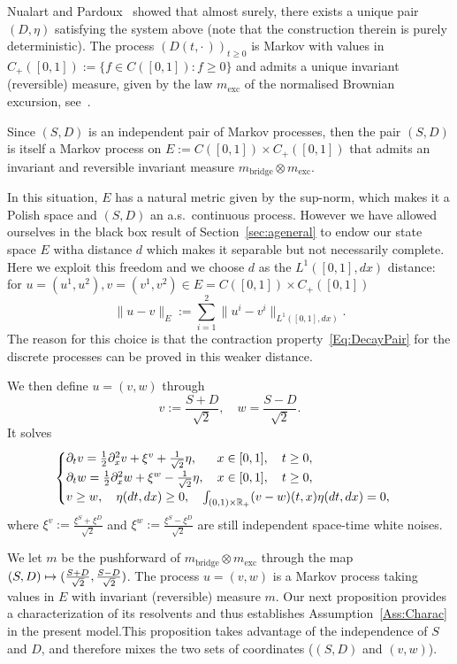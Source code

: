 \documentclass[10pt]{amsart}
\theoremstyle{definition}\newtheorem{defi}[theo]{Definition}\newtheorem{rema}[theo]{Remark}\newtheorem{exam}[theo]{Example}\newtheorem{exem}[theo]{Example}\newtheorem{nota}[theo]{Notation}
\theoremstyle{plain}
\newcommand{\R}{\mathbb{R}}
\newcommand{\mBB}{m_{\mathrm{bridge}}}
\newcommand{\mBE}{m_{\mathrm{exc}}}
\let\oldmapsto\mapsto
\renewcommand*{\mapsto}{\mathchoice{\longmapsto}{\oldmapsto}{\oldmapsto}{\oldmapsto}}
\begin{document}
Nualart and Pardoux~\cite{NualartPardoux92} showed that almost surely, there exists a unique pair $(D,\eta)$ satisfying the system above (note that the construction therein is purely deterministic). The process $(D(t,\cdot\,))_{t\geq 0}$ is Markov with values in $C_+([0,1]):=\{f\in C([0,1]): f\geq 0\}$ and admits a unique invariant (reversible) measure, given by the law $\mBE$ of the normalised Brownian excursion, see~\cite{MR3616274,Zambotti2001}.

Since $(S,D)$ is an independent pair of Markov processes, then the pair $(S,D)$ is itself a Markov process on $E:=C([0,1])\times C_+([0,1])$ that admits an invariant and reversible invariant measure $\mBB \otimes \mBE$.

In this situation, $E$ has a natural metric given by the sup-norm, which makes it a Polish space and $(S,D)$ an a.s.~continuous process. However we have allowed ourselves in the black box result of Section~\ref{sec:ageneral} to endow our state space $E$ with\linebreak a distance $d$ which makes it separable but not necessarily complete. Here we exploit this freedom and we choose $d$ as the $L^1([0,1],dx)$ distance: for $u=(u^1,u^2), v=(v^1,v^2)\in E=C([0,1])\times C_+([0,1])$
\[
\|u-v\|_E:=\sum_{i=1}^2\|u^i-v^i\|_{L^1([0,1],dx)}.
\]
The reason for this choice is that the contraction property~\eqref{Eq:DecayPair} for the discrete processes can be proved in this weaker distance.

We then define $u=(v,w)$ through
\[
v := \frac{S+D}{\sqrt 2} ,\quad w = \frac{S-D}{\sqrt 2}.
\]
It solves
\begin{equation}\label{eq:theSPDEs}
\begin{cases}
\partial_t v = \frac12\partial^2_x v + \xi^v + \frac1{\sqrt 2}\eta,\mkern29mu x\in [0,1],\quad t\ge 0,\\
\partial_t w = \frac12\partial^2_x w + \xi^w - \frac1{\sqrt 2}\eta,\quad x\in [0,1],\quad t\ge 0,\\
v\ge w,\quad \eta(dt,dx)\ge 0,\quad \int_{(0,1)\times \R_+} (v-w)(t,x) \eta(dt,dx) = 0,
\end{cases}
\end{equation}
where $\xi^v := \frac{\xi^S+\xi^D}{\sqrt 2}$ and $\xi^w:=\frac{\xi^S - \xi^D}{\sqrt 2}$ are still independent space-time white noises.

We let $m$ be the pushforward of $\mBB\otimes \mBE$ through the map $(S,D) \mapsto (\frac{S+D}{\sqrt 2}, \frac{ S-D }{\sqrt 2})$. The process $u=(v,w)$ is a Markov process taking values in $E$ with invariant (reversible) measure $m$. Our next proposition provides a characterization of its resolvents and thus establishes Assumption~\ref{Ass:Charac} in the present model.\linebreak This proposition takes advantage of the independence of $S$ and $D$, and therefore mixes the two sets of coordinates ($(S,D)$ and $(v,w)$).
\end{document}
